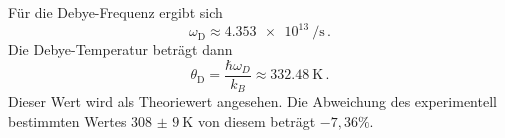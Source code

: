 Für die Debye-Frequenz ergibt sich
\begin{equation}
  \omega_\text{D} \approx \SI{4.353e13}{\per\second}\,.
\end{equation}
Die Debye-Temperatur beträgt dann
\begin{equation*}
  \theta_\text{D} = \frac{\hbar \omega_D}{k_B} \approx \SI{332.48}{\kelvin} \,.
\end{equation*}
Dieser Wert wird als Theoriewert angesehen. Die Abweichung des experimentell bestimmten Wertes $\SI{308(9)}{\kelvin}$ von diesem beträgt $-7,36\%$.
